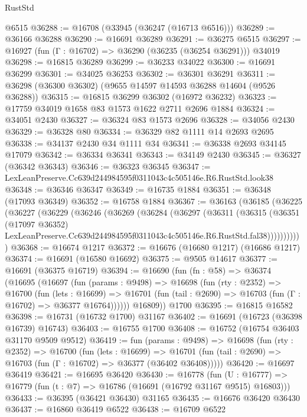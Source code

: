 \begin{lexlean}{RustStd}
\begin{coremodule}
    @6515
@36288 := @16708 (@33945 (@36247 (@16713 @6516)))
@36289 := @36166 @36288
@36290 := @16691 @36289
@36291 := @36275 @6515
@36297 := @16927 (fun (Γ : @16702) => @36290 (@36235 (@36254 @36291))) @34019
@36298 := @16815 @36289
@36299 := @36233 @34022
@36300 := @16691 @36299
@36301 := @34025 @36253
@36302 := @36301 @36291
@36311 := @36298 (@36300 @36302) (@9655 @14597 @14593 @36288 @14604 (@9526 @36288))
@36315 := @16815 @36299 @36302 (@16972 @36232)
@36323 := @17759 @34019 @1658 @83 @1573 @1622 @2711 @2696 @1884
@36324 := @34051 @2430
@36327 := @36324 @83 @1573 @2696
@36328 := @34056 @2430
@36329 := @36328 @80
@36334 := @36329 @82 @1111 @14 @2693 @2695
@36338 := @34137 @2430 @34 @1111 @34
@36341 := @36338 @2693 @34145 @17079
@36342 := @36334 @36341
@36343 := @34149 @2430
@36345 := @36327 (@36342 @36343)
@36346 := @36323 @36345
@36347 := LexLeanPreserve.Cc639d244984595f0311043c4c505146e.R6.RustStd.look38
@36348 := @36346 @36347
@36349 := @16735 @1884
@36351 := @36348 (@17093 @36349)
@36352 := @16758 @1884
@36367 := @36163
    (@36185
      (@36225
        (@36227
          (@36229
            (@36246
              (@36269
                (@36284
                  (@36297
                    (@36311
                      (@36315
                        (@36351
                          (@17097 @36352)
                          LexLeanPreserve.Cc639d244984595f0311043c4c505146e.R6.RustStd.fal38)))))))))))
@36368 := @16674 @1217
@36372 := @16676 (@16680 @1217) (@16686 @1217)
@36374 := @16691 (@16580 @16692)
@36375 := @9505 @14617
@36377 := @16691 (@36375 @16719)
@36394 := @16690
    (fun (fn : @58) =>
    @36374
      (@16695
        (@16697
          (fun (params : @9498) =>
          @16698
            (fun (rty : @2352) =>
            @16700
              (fun (lets : @16699) =>
              @16701 (fun (tail : @2690) => @16703 (fun (Γ : @16702) => @36377 @16764))))))
        @16809))
    @1700
@36395 := @16815 @16582
@36398 := @16731 (@16732 @1700) @31167
@36402 := @16691 (@16723 (@36398 @16739) @16743)
@36403 := @16755 @1700
@36408 := @16752 (@16754 @36403 @31170 @9509 @9512)
@36419 := fun (params : @9498) =>
  @16698
    (fun (rty : @2352) =>
    @16700
      (fun (lets : @16699) =>
      @16701 (fun (tail : @2690) => @16703 (fun (Γ : @16702) => @36377 (@36402 @36408)))))
@36420 := @16697 @36419
@36421 := @16695 @36420
@36430 := @16778
    (fun (U : @16777) => @16779 (fun (t : @7) => @16786 (@16691 (@16792 @31167 @9515) @16803)))
@36433 := @36395 (@36421 @36430) @31165
@36435 := @16676 @36420 @36430
@36437 := @16860 @36419 @6522
@36438 := @16709 @6522

\end{coremodule}
\end{lexlean}
